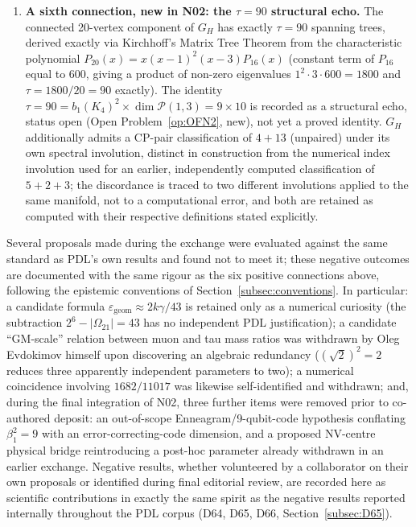 \documentclass[11pt,a4paper]{article}
\theoremstyle{plain}
\theoremstyle{definition}
\theoremstyle{remark}
\newcommand{\Kfour}{K_4}
\begin{document}
\begin{enumerate}[label=(\roman*)]
\item \textbf{A sixth connection, new in N02: the $\tau=90$ structural echo.} The connected 20-vertex component of $G_H$ has exactly $\tau=90$ spanning trees, derived exactly via Kirchhoff's Matrix Tree Theorem from the characteristic polynomial $P_{20}(x)=x(x-1)^2(x-3)P_{16}(x)$ (constant term of $P_{16}$ equal to $600$, giving a product of non-zero eigenvalues $1^2\cdot3\cdot600=1800$ and $\tau=1800/20=90$ exactly). The identity $\tau=90=b_1(\Kfour)^2\times\dim\mathcal P(1,3)=9\times10$ is recorded as a structural echo, status open (Open Problem~\ref{op:OFN2}, new), not yet a proved identity. $G_H$ additionally admits a CP-pair classification of $4+13$ (unpaired) under its own spectral involution, distinct in construction from the numerical index involution used for an earlier, independently computed classification of $5+2+3$; the discordance is traced to two different involutions applied to the same manifold, not to a computational error, and both are retained as computed with their respective definitions stated explicitly.
\end{enumerate}

Several proposals made during the exchange were evaluated against the same standard as PDL's own results and found not to meet it; these negative outcomes are documented with the same rigour as the six positive connections above, following the epistemic conventions of Section~\ref{subsec:conventions}. In particular: a candidate formula $\varepsilon_{\mathrm{geom}}\approx 2k\gamma/43$ is retained only as a numerical curiosity (the subtraction $2^6-|\Omega_{21}|=43$ has no independent PDL justification); a candidate ``GM-scale'' relation between muon and tau mass ratios was withdrawn by Oleg Evdokimov himself upon discovering an algebraic redundancy ($(\sqrt{2})^2=2$ reduces three apparently independent parameters to two); a numerical coincidence involving $1682/11017$ was likewise self-identified and withdrawn; and, during the final integration of N02, three further items were removed prior to co-authored deposit: an out-of-scope Enneagram/9-qubit-code hypothesis conflating $\beta_1^2=9$ with an error-correcting-code dimension, and a proposed NV-centre physical bridge reintroducing a post-hoc parameter already withdrawn in an earlier exchange. Negative results, whether volunteered by a collaborator on their own proposals or identified during final editorial review, are recorded here as scientific contributions in exactly the same spirit as the negative results reported internally throughout the PDL corpus (D64, D65, D66, Section~\ref{subsec:D65}).
\end{document}
